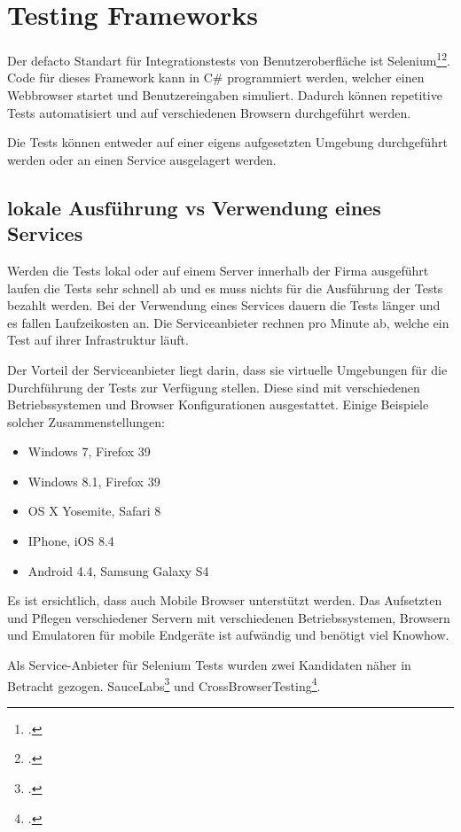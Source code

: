 \section{Testing Frameworks}
\label{sec:Recherche:TestingFrameworks}
Der defacto Standart für Integrationstests von Benutzeroberfläche ist Selenium\footcite{Selenium_-_Web_Browser_Automation_2015-07-26}\footcite{Happy_10th_Birthday_Selenium_ThoughtWorks_2015-07-26}. Code für dieses Framework kann in C\# programmiert werden, welcher einen Webbrowser startet und Benutzereingaben simuliert. Dadurch können repetitive Tests automatisiert und auf verschiedenen Browsern durchgeführt werden.

Die Tests können entweder auf einer eigens aufgesetzten Umgebung durchgeführt werden oder an einen Service ausgelagert werden.

\subsection{lokale Ausführung vs Verwendung eines Services}
\label{sec:Recherche:TestingFrameworks:vs}
Werden die Tests lokal oder auf einem Server innerhalb der Firma ausgeführt laufen die Tests sehr schnell ab und es muss nichts für die Ausführung der Tests bezahlt werden. Bei der Verwendung eines Services dauern die Tests länger und es fallen Laufzeikosten an. Die Serviceanbieter rechnen pro Minute ab, welche ein Test auf ihrer Infrastruktur läuft.

Der Vorteil der Serviceanbieter liegt darin, dass sie virtuelle Umgebungen für die Durchführung der Tests zur Verfügung stellen. Diese sind mit verschiedenen Betriebssystemen und Browser Konfigurationen ausgestattet. Einige Beispiele solcher Zusammenstellungen:
\begin{itemize}
\item Windows 7, Firefox 39
\item Windows 8.1, Firefox 39
\item OS X Yosemite, Safari 8
\item IPhone, iOS 8.4
\item Android 4.4, Samsung Galaxy S4
\end{itemize}
Es ist ersichtlich, dass auch Mobile Browser unterstützt werden. Das Aufsetzten und Pflegen verschiedener Servern mit verschiedenen Betriebssystemen, Browsern und Emulatoren für mobile Endgeräte ist aufwändig und benötigt viel Knowhow. 

Als Service-Anbieter für Selenium Tests wurden zwei Kandidaten näher in Betracht gezogen. SauceLabs\footcite{Sauce_Labs_2015-07-26} und CrossBrowserTesting\footcite{Cross_Browser_Testing_2015-07-26}.

